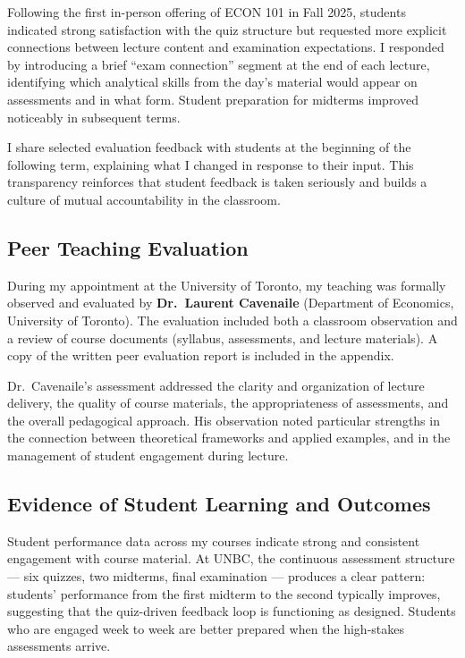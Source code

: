 \documentclass[11pt,letterpaper]{article}
\begin{document}
Following the first in-person offering of ECON 101 in Fall 2025, students indicated strong satisfaction with the quiz structure but requested more explicit connections between lecture content and examination expectations. I responded by introducing a brief ``exam connection'' segment at the end of each lecture, identifying which analytical skills from the day's material would appear on assessments and in what form. Student preparation for midterms improved noticeably in subsequent terms.

I share selected evaluation feedback with students at the beginning of the following term, explaining what I changed in response to their input. This transparency reinforces that student feedback is taken seriously and builds a culture of mutual accountability in the classroom.

\subsection{Peer Teaching Evaluation}

During my appointment at the University of Toronto, my teaching was formally observed and evaluated by \textbf{Dr.\ Laurent Cavenaile} (Department of Economics, University of Toronto). The evaluation included both a classroom observation and a review of course documents (syllabus, assessments, and lecture materials). A copy of the written peer evaluation report is included in the appendix.

Dr.\ Cavenaile's assessment addressed the clarity and organization of lecture delivery, the quality of course materials, the appropriateness of assessments, and the overall pedagogical approach. His observation noted particular strengths in the connection between theoretical frameworks and applied examples, and in the management of student engagement during lecture.

\subsection{Evidence of Student Learning and Outcomes}

Student performance data across my courses indicate strong and consistent engagement with course material. At UNBC, the continuous assessment structure --- six quizzes, two midterms, final examination --- produces a clear pattern: students' performance from the first midterm to the second typically improves, suggesting that the quiz-driven feedback loop is functioning as designed. Students who are engaged week to week are better prepared when the high-stakes assessments arrive.
\end{document}
